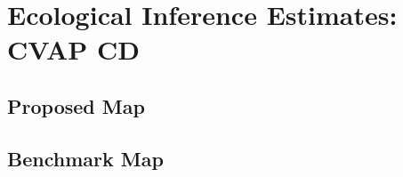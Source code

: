 \documentclass[12pt,draft]{scrartcl}
\begin{document}
\singlespace
 
\bibsep=0in 
{}
%


\clearpage
{}
{}

\appendix
\renewcommand*\appendixpagename{\section*{Appendix}}
\appendixpage

\section{Ecological Inference Estimates: CVAP CD}
\subsection{Proposed Map}
















\newpage
\clearpage
\subsection{Benchmark Map}
















\end{document}
